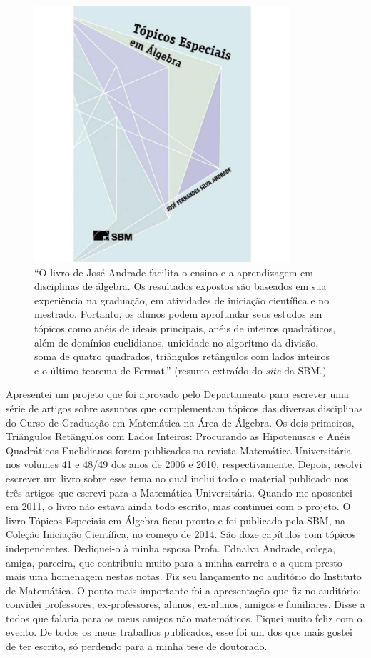 \documentclass{hipatia}
\begin{document}
\begin{figure}[htb!]
\begin{center}
\includegraphics[width=9.5cm]{livro.png}
\end{center}
\caption{``O livro de José Andrade facilita 
o ensino e a aprendizagem em disciplinas 
de álgebra. Os resultados expostos são baseados 
em sua experiência na graduação, em atividades 
de iniciação científica e no mestrado. Portanto, 
os alunos podem aprofundar seus estudos em 
tópicos como anéis de ideais principais, 
anéis de inteiros quadráticos, além de domínios euclidianos, 
unicidade no algoritmo da divisão, soma de quatro 
quadrados, triângulos retângulos com 
lados inteiros e o último teorema de Fermat.'' (resumo
extraído do \emph{site} da SBM.)}   
\end{figure}

Apresentei um projeto que foi aprovado pelo Departamento
para escrever uma série de artigos sobre assuntos que
complementam tópicos das diversas disciplinas do Curso de
Graduação em Matemática na Área de Álgebra. Os dois
primeiros, Triângulos Retângulos com Lados Inteiros:
Procurando as Hipotenusas e Anéis Quadráticos Euclidianos
foram publicados na revista Matemática Universitária nos
volumes 41 e 48/49 dos anos de 2006 e 2010, respectivamente.
Depois, resolvi escrever um livro sobre esse tema no qual
inclui todo o material publicado nos três artigos que
escrevi para a Matemática Universitária. Quando me aposentei
em 2011, o livro não estava ainda todo escrito, mas continuei
com o projeto. O livro Tópicos Especiais em Álgebra ficou
pronto e foi publicado pela SBM, na Coleção Iniciação
Científica, no começo de 2014. São doze capítulos com tópicos
independentes. Dediquei-o à minha esposa Profa. Ednalva
Andrade, colega, amiga, parceira, que contribuiu muito para
a minha carreira e a quem presto mais uma homenagem nestas
notas. Fiz seu lançamento no auditório do Instituto de
Matemática. O ponto mais importante foi a apresentação que
fiz no auditório: convidei professores, ex-professores,
alunos, ex-alunos, amigos e familiares. Disse a todos que
falaria para os meus amigos não matemáticos. Fiquei muito
feliz com o evento. De todos os meus trabalhos publicados,
esse foi um dos que mais gostei de ter escrito, só perdendo
para a minha tese de doutorado. 
\end{document}
